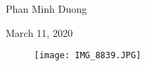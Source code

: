 \documentclass[article, paper=a4, fontsize=11pt]{scrartcl}
\begin{document}
\begin{center}
Phan Minh Duong
\end{center}
\begin{center}
March 11, 2020
\end{center}
\begin{figure}[h!]
 \centering
  \texttt{[image: IMG\_8839.JPG]} 
  \label{fig:boat1}
 
\end{figure}
\end{document}
